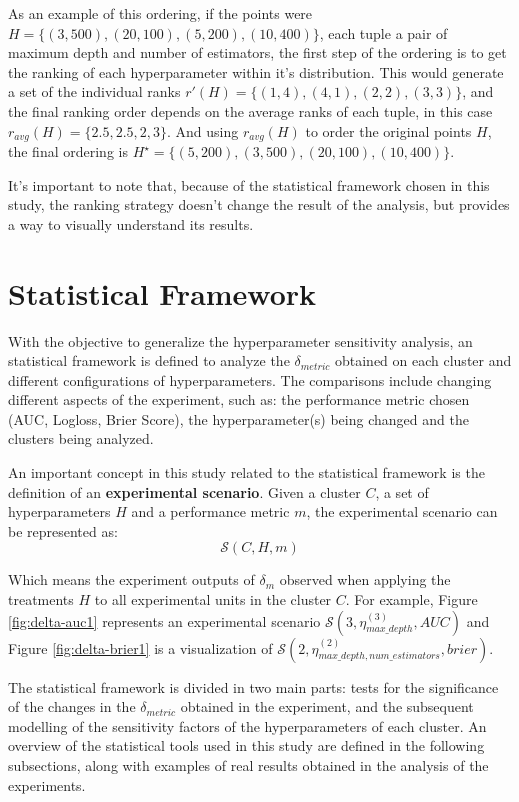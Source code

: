 As an example of this ordering, if the points were $H = \{(3, 500), (20, 100), (5, 200), (10, 400)\}$, each tuple a 
pair of maximum depth and number of estimators, the first step of the ordering is to get the ranking of each hyperparameter within it's distribution. This would generate a set of the individual ranks $r'(H) = \{(1, 4), (4, 1), (2, 2), (3, 3)\}$, and the final ranking order depends on the average ranks of each tuple, in this case $r_{avg}(H) = \{2.5, 2.5, 2, 3\}$. And using $r_{avg}(H)$ to order the original points $H$, the final ordering is $H^\star = \{(5, 200), (3, 500), (20, 100), (10, 400)\}$.

It's important to note that, because of the statistical framework chosen in this study, the ranking strategy doesn't change the result of the analysis, but provides a way to visually understand its results.

\section{Statistical Framework}

With the objective to generalize the hyperparameter sensitivity analysis, an statistical framework is defined to analyze the $\delta_{metric}$ obtained on each cluster and different configurations of hyperparameters. The comparisons include changing different aspects of the experiment, such as: the performance metric chosen (AUC, Logloss, Brier Score), the hyperparameter(s) being changed and the clusters being analyzed.

An important concept in this study related to the statistical framework is the definition of an \textbf{experimental scenario}. Given a cluster $C$, a set of hyperparameters $H$ and a performance metric $m$, the experimental scenario can be represented as:
 $$\mathcal{S}(C, H, m)$$

Which means the experiment outputs of $\delta_m$ observed when applying the treatments $H$ to all experimental units in the cluster $C$. For example,  Figure  \ref{fig:delta-auc1} represents an experimental scenario $\mathcal{S}(3, \eta^{(3)}_{max\_depth}, AUC)$ and Figure  \ref{fig:delta-brier1} is a visualization of $\mathcal{S}(2, \eta^{(2)}_{max\_depth,num\_estimators}, brier)$.

The statistical framework is divided in two main parts: tests for the significance of the changes in the $\delta_{metric}$ obtained in the experiment, and the subsequent modelling of the sensitivity factors of the hyperparameters of each cluster. An overview of the statistical tools used in this study are defined in the following subsections, along with examples of real results obtained in the analysis of the experiments.


